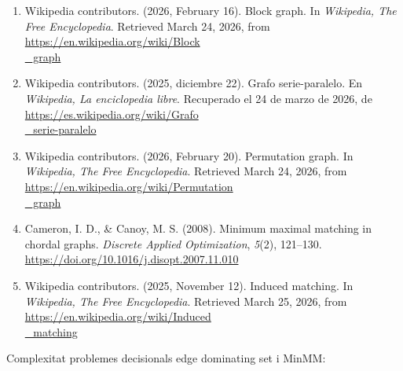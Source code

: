 \begin{enumerate}
\item Wikipedia contributors. (2026, February 16). Block graph. In \textit{Wikipedia, The Free Encyclopedia}. Retrieved March 24, 2026, from \href{https://en.wikipedia.org/wiki/Block\\\_graph}{https://en.wikipedia.org/wiki/Block\\\_graph}
\item Wikipedia contributors. (2025, diciembre 22). Grafo serie-paralelo. En \textit{Wikipedia, La enciclopedia libre}. Recuperado el 24 de marzo de 2026, de \href{https://es.wikipedia.org/wiki/Grafo\\\_serie-paralelo}{https://es.wikipedia.org/wiki/Grafo\\\_serie-paralelo}
\item Wikipedia contributors. (2026, February 20). Permutation graph. In \textit{Wikipedia, The Free Encyclopedia}. Retrieved March 24, 2026, from \href{https://en.wikipedia.org/wiki/Permutation\\\_graph}{https://en.wikipedia.org/wiki/Permutation\\\_graph}
\item Cameron, I. D., \& Canoy, M. S. (2008). Minimum maximal matching in chordal graphs. \textit{Discrete Applied Optimization}, \textit{5}(2), 121--130. \href{https://doi.org/10.1016/j.disopt.2007.11.010}{https://doi.org/10.1016/j.disopt.2007.11.010}
\item Wikipedia contributors. (2025, November 12). Induced matching. In \textit{Wikipedia, The Free Encyclopedia}. Retrieved March 25, 2026, from \href{https://en.wikipedia.org/wiki/Induced\\\_matching}{https://en.wikipedia.org/wiki/Induced\\\_matching}
\end{enumerate}

Complexitat problemes decisionals edge dominating set i MinMM:

